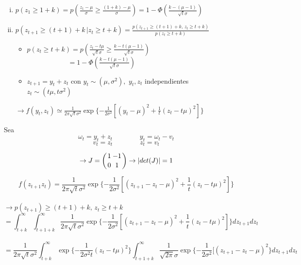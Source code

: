 \begin{enumerate}[(i)]
 \item $p(z_1\ge 1+k)=p{\displaystyle\left(\frac{z_1-\mu}{\sigma}\ge\frac{(1+k)-\mu}{\sigma}\right)=1-\Phi\left(\frac{k-(\mu-1)}{\sqrt{t}\sigma}\right)}$\\
 
 \item $p(z_{t+1}\ge (t+1)+k\,|z_t\ge t+k)=\displaystyle\frac{p(z_{t+1}\ge (t+1)+k,\,z_t\ge t+k)}{p(z_t\ge t+k)}$\\
 
    \begin{itemize}
     \item $p(z_t\ge t+k)=p{\displaystyle\left(\frac{z_t-t\mu}{\sqrt{t}\sigma}\ge\frac{k-t(\mu-1)}{\sqrt{t}\sigma}\right)}$\\
     
     $\qquad\qquad\qquad={\displaystyle 1-\Phi\left(\frac{k-t(\mu-1)}{\sqrt{t}\sigma}\right)}$\\
     
     \item $z_{t+1}=y_t+z_t$ con $y_t \sim (\mu,\sigma^2),\,\,y_t,z_t$ independientes\\ $z_t\sim(t\mu,t\sigma^2)$
    \end{itemize}
$\rightarrow f(y_t,z_t)\simeq \displaystyle\frac{1}{2\pi\sqrt{t}\sigma^2}\exp\{-\frac{1}{2\sigma^2}[(y_t-\mu)^2+\frac{1}{t}(z_t-t\mu)^2]\}$
\end{enumerate}

Sea \[\omega_t=y_t+z_t\qquad\qquad y_t=\omega_t-v_t\]
\[v_t=z_t\qquad\qquad z_t=v_t\]

\[\rightarrow J=\left( {1\atop 0} {-1\atop {1}} \right)\rightarrow |det(J)|=1\]

\[f(z_{t+1}z_t)=\displaystyle\frac{1}{2\pi\sqrt{t}\sigma^2}\exp\{\displaystyle -\frac{1}{2\sigma^2}[(z_{t+1}-z_t-\mu)^2+\frac{1}{t}(z_t-t\mu)^2]\}\]\\

$\rightarrow p(z_{t+1})\ge (t+1)+k,\,z_t\ge t+k$\\

\[={\displaystyle\int_{t+k}^{\infty}\int_{t+1+k}^{\infty}\frac{1}{2\pi\sqrt{t}\sigma^2}\exp\{\displaystyle -\frac{1}{2\sigma^2}[(z_{t+1}-z_t-\mu)^2+\frac{1}{t}(z_t-t\mu)^2]\}}dz_{t+1}dz_t\]\\

\[{=\displaystyle\frac{1}{2\pi\sqrt{t}\sigma^2}\int_{t+k}^{\infty}\exp\{-\frac{1}{2\sigma^2 t}(z_t-t\mu)^2\}\int_{t+1+k}^{\infty}\frac{1}{\sqrt{2\pi}\sigma}\exp\{\displaystyle -\frac{1}{2\sigma^2}[(z_{t+1}-z_t-\mu)^2\}dz_{t+1}dz_t}\]\\

